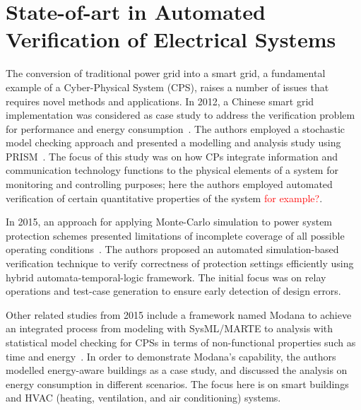 \documentclass[runningheads]{llncs}
\begin{document}
\section{State-of-art in Automated Verification of Electrical Systems}

The conversion of traditional power grid into a smart grid, a fundamental example of a Cyber-Physical System (CPS), raises a number of issues that requires novel methods and applications. In 2012, a Chinese smart grid implementation was considered as case study to address the verification problem for performance and energy consumption~\cite{Yukseletall2012}. The authors employed a stochastic model checking approach and presented a modelling and analysis study using PRISM~\cite{KwiatkowskaNP11}. The focus of this study was on how CPs integrate information and communication technology functions to the physical elements of a system for monitoring and controlling purposes; here the authors employed automated verification of certain quantitative properties of the system \textcolor{red}{for example?}. %

In 2015, an approach for applying Monte-Carlo simulation to power system protection schemes presented limitations of incomplete coverage of all possible operating conditions~\cite{Sengupta2015}. The authors proposed an automated simulation-based verification technique to verify correctness of protection settings efficiently using hybrid automata-temporal-logic framework. The initial focus was on relay operations and test-case generation to ensure early detection of design errors. %

Other related studies from 2015 include a framework named Modana to achieve an integrated process from modeling with SysML/MARTE to analysis with statistical model checking for CPSs in terms of non-functional properties such as time and energy~\cite{Cheng2015}. In order to demonstrate Modana's capability, the authors modelled energy-aware buildings as a case study, and discussed the analysis on energy consumption in different scenarios. The focus here is on smart buildings and HVAC (heating, ventilation, and air conditioning) systems. %
 
\end{document}
